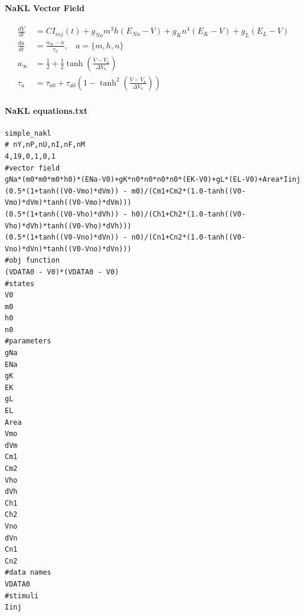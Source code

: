 \documentclass[11pt]{article}
\begin{document}
\paragraph{NaKL Vector Field}
\begin{align*}
\frac{dV}{dt}&=CI_{inj}(t) + g_{Na}m^3h(E_{Na}-V) + g_{K}n^4(E_K-V) + g_L(E_L-V)\\
\frac{da}{dt}&=\frac{a_\infty-a}{\tau_a}, ~~~~a=\{m, h, n\}\\
a_\infty&=\frac12+\frac12\tanh\left(\frac{V-V_a}{\Delta V_a}\right)\\
\tau_a&=\tau_{a0}+\tau_{a0}\left(1-\tanh^2\left(\frac{V-V_a}{\Delta V_a}\right)\right)
\end{align*}
\paragraph{NaKL equations.txt}
\begin{verbatim}
simple_nakl
# nY,nP,nU,nI,nF,nM
4,19,0,1,0,1
#vector field
gNa*(m0*m0*m0*h0)*(ENa-V0)+gK*n0*n0*n0*n0*(EK-V0)+gL*(EL-V0)+Area*Iinj
(0.5*(1+tanh((V0-Vmo)*dVm)) - m0)/(Cm1+Cm2*(1.0-tanh((V0-Vmo)*dVm)*tanh((V0-Vmo)*dVm)))
(0.5*(1+tanh((V0-Vho)*dVh)) - h0)/(Ch1+Ch2*(1.0-tanh((V0-Vho)*dVh)*tanh((V0-Vho)*dVh)))
(0.5*(1+tanh((V0-Vno)*dVn)) - n0)/(Cn1+Cn2*(1.0-tanh((V0-Vno)*dVn)*tanh((V0-Vno)*dVn)))
#obj function
(VDATA0 - V0)*(VDATA0 - V0)
#states
V0
m0
h0
n0
#parameters
gNa
ENa
gK
EK
gL
EL
Area
Vmo
dVm
Cm1
Cm2
Vho
dVh
Ch1
Ch2
Vno
dVn
Cn1
Cn2
#data names
VDATA0
#stimuli
Iinj
\end{verbatim}
\end{document}
